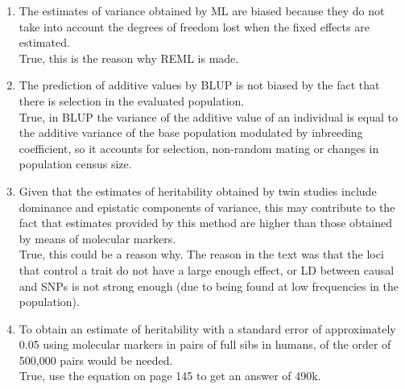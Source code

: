 \documentclass[12pt]{amsart}
\begin{document}
\begin{enumerate}
\item The estimates of variance obtained by ML are biased because they do not take into account the degrees of freedom lost when the fixed effects are estimated.\\
True, this is the reason why REML is made.\\	

\item The prediction of additive values by BLUP is not biased by the fact that there is selection in the evaluated population.\\
True, in BLUP the variance of the additive value of an individual is equal to the additive variance of the base population modulated by inbreeding coefficient, so it accounts for selection, non-random mating or changes in population census size.\\

\item Given that the estimates of heritability obtained by twin studies include dominance and epistatic components of variance, this may contribute to the fact that estimates provided by this method are higher than those obtained by means of molecular markers.\\
True, this could be a reason why. The reason in the text was that the loci that control a trait do not have a large enough effect, or LD between causal and SNPs is not strong enough (due to being found at low frequencies in the population).\\

\item To obtain an estimate of heritability with a standard error of approximately 0.05 using molecular markers in pairs of full sibs in humans, of the order of 500,000 pairs would be needed. \\
True, use the equation on page 145 to get an answer of 490k.


\end{enumerate}


\medskip
\end{document}
